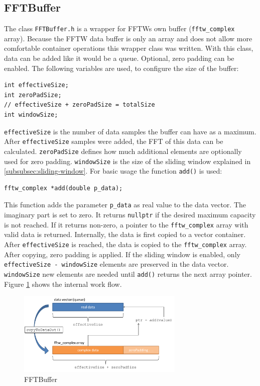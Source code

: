 \documentclass[notitlepage]{scrreprt}
\begin{document}
\subsection{FFTBuffer}
\label{subsec:fft-buffer}
The class \lstinline{FFTBuffer.h} is a wrapper for FFTWs own buffer (\lstinline{fftw_complex} array). Because the FFTW data buffer is only an array and does not allow more comfortable container operations this wrapper class was written. With this class, data can be added like it would be a queue. Optional, zero padding can be enabled. The following variables are used, to configure the size of the buffer:

\begin{lstlisting}
int effectiveSize;
int zeroPadSize;
// effectiveSize + zeroPadSize = totalSize
int windowSize;
\end{lstlisting}

\lstinline{effectiveSize} is the number of data samples the buffer can have as a maximum. After \lstinline{effectiveSize} samples were added, the FFT of this data can be calculated. \lstinline{zeroPadSize} defines how much additional elements are optionally used for zero padding. \lstinline{windowSize} is the size of the sliding window explained in \ref{subsubsec:sliding-window}. For basic usage the function \lstinline{add()} is used:

\begin{lstlisting}
fftw_complex *add(double p_data);
\end{lstlisting}

This function adds the parameter \lstinline{p_data} as real value to the data vector. The imaginary part is set to zero. It returns \lstinline{nullptr} if the desired maximum capacity is not reached. If it returns non-zero, a pointer to the \lstinline{fftw_complex} array with valid data is returned. Internally, the data is first copied to a vector container. After \lstinline{effectiveSize} is reached, the data is copied to the \lstinline{fftw_complex} array. After copying, zero padding is applied. If the sliding window is enabled, only \lstinline{effectiveSize - windowSize} elements are preserved in the data vector. \lstinline{windowSize} new elements are needed until \lstinline{add()} returns the next array pointer. Figure \ref{fig:fft-buffer} shows the internal work flow.

\begin{figure}[H]
	\centering
	\includegraphics[width=300px]{images/FFTBuffer.png}
	\caption{FFTBuffer}
	\label{fig:fft-buffer}
\end{figure}
\end{document}
